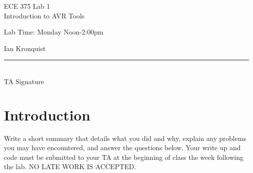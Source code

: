 \documentclass[12pt,letterpaper]{article}
\begin{document}
\begin{titlepage}
    \vspace*{4cm}
    \begin{flushright}
    {\huge
        ECE 375 Lab 1\\[1cm]
    }
    {\large
        Introduction to AVR Tools
    }
    \end{flushright}
    \begin{flushleft}
    Lab Time: Monday Noon-2:00pm
    \end{flushleft}
    \begin{flushright}
    Ian Kronquist
    \vfill
    \rule{5in}{.5mm}\\
    TA Signature
    \end{flushright}

\end{titlepage}

\section{Introduction}
Write a short summary that details what you did and why, explain any problems you may have encountered, and answer the questions below. Your write up and code must be submitted to your TA at the beginning of class the week following the lab. NO LATE WORK IS ACCEPTED.
\end{document}

